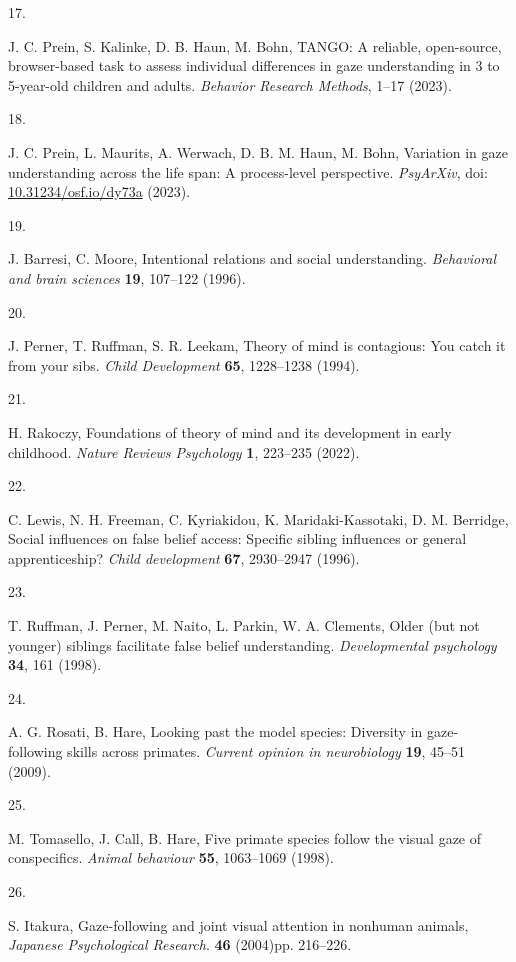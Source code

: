 \documentclass[
  man,floatsintext]{apa6}
\newlength{\cslhangindent}
\newlength{\csllabelwidth}
\newlength{\cslentryspacingunit} %
\newenvironment{CSLReferences}[2] %
 {%
  \setlength{\parindent}{0pt}
  \ifodd #1
  \let\oldpar\par
  \def\par{\hangindent=\cslhangindent\oldpar}
  \fi
  \setlength{\parskip}{#2\cslentryspacingunit}
 }%
 {}
\newcommand{\CSLLeftMargin}[1]{\parbox[t]{\csllabelwidth}{#1}}
\newcommand{\CSLRightInline}[1]{\parbox[t]{\linewidth - \csllabelwidth}{#1}\break}
\begin{document}
\begin{CSLReferences}{0}{0}
\leavevmode{}%
\CSLLeftMargin{17. }%
\CSLRightInline{J. C. Prein, S. Kalinke, D. B. Haun, M. Bohn, TANGO: A reliable, open-source, browser-based task to assess individual differences in gaze understanding in 3 to 5-year-old children and adults. \emph{Behavior Research Methods}, 1--17 (2023).}

\leavevmode{}%
\CSLLeftMargin{18. }%
\CSLRightInline{J. C. Prein, L. Maurits, A. Werwach, D. B. M. Haun, M. Bohn, Variation in gaze understanding across the life span: {A} process-level perspective. \emph{{PsyArXiv}}, doi: \href{https://doi.org/10.31234/osf.io/dy73a}{10.31234/osf.io/dy73a} (2023).}

\leavevmode{}%
\CSLLeftMargin{19. }%
\CSLRightInline{J. Barresi, C. Moore, Intentional relations and social understanding. \emph{Behavioral and brain sciences} \textbf{19}, 107--122 (1996).}

\leavevmode{}%
\CSLLeftMargin{20. }%
\CSLRightInline{J. Perner, T. Ruffman, S. R. Leekam, Theory of mind is contagious: You catch it from your sibs. \emph{Child Development} \textbf{65}, 1228--1238 (1994).}

\leavevmode{}%
\CSLLeftMargin{21. }%
\CSLRightInline{H. Rakoczy, Foundations of theory of mind and its development in early childhood. \emph{Nature Reviews Psychology} \textbf{1}, 223--235 (2022).}

\leavevmode{}%
\CSLLeftMargin{22. }%
\CSLRightInline{C. Lewis, N. H. Freeman, C. Kyriakidou, K. Maridaki-Kassotaki, D. M. Berridge, Social influences on false belief access: Specific sibling influences or general apprenticeship? \emph{Child development} \textbf{67}, 2930--2947 (1996).}

\leavevmode{}%
\CSLLeftMargin{23. }%
\CSLRightInline{T. Ruffman, J. Perner, M. Naito, L. Parkin, W. A. Clements, Older (but not younger) siblings facilitate false belief understanding. \emph{Developmental psychology} \textbf{34}, 161 (1998).}

\leavevmode{}%
\CSLLeftMargin{24. }%
\CSLRightInline{A. G. Rosati, B. Hare, Looking past the model species: Diversity in gaze-following skills across primates. \emph{Current opinion in neurobiology} \textbf{19}, 45--51 (2009).}

\leavevmode{}%
\CSLLeftMargin{25. }%
\CSLRightInline{M. Tomasello, J. Call, B. Hare, Five primate species follow the visual gaze of conspecifics. \emph{Animal behaviour} \textbf{55}, 1063--1069 (1998).}

\leavevmode{}%
\CSLLeftMargin{26. }%
\CSLRightInline{S. Itakura, Gaze-following and joint visual attention in nonhuman animals, \emph{Japanese Psychological Research}. \textbf{46} (2004)pp. 216--226.}

\end{CSLReferences}
\end{document}
